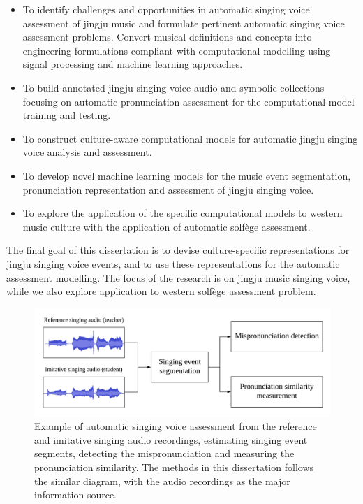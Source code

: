 \begin{itemize}[leftmargin=*]
\item To identify challenges and opportunities in automatic singing voice assessment of jingju music and formulate pertinent automatic singing voice assessment problems. Convert musical definitions and concepts into engineering formulations compliant with computational modelling using signal processing and machine learning approaches.
\item To build annotated jingju singing voice audio and symbolic collections focusing on automatic pronunciation assessment for the computational model training and testing.
\item To construct culture-aware computational models for automatic jingju singing voice analysis and assessment.
\item To develop novel machine learning models for the music event segmentation, pronunciation representation and assessment of jingju singing voice.
\item To explore the application of the specific computational models to western music culture with the application of automatic solfège assessment. 
\end{itemize}

The final goal of this dissertation is to devise culture-specific representations for jingju singing voice events, and to use these representations for the automatic assessment modelling. The focus of the research is on jingju music singing voice, while we also explore application to western solfège assessment problem.

\begin{figure}
\centering
\includegraphics[scale=0.2]{figs/blockDiags_rong/ch1_motivation_audio.png}
\caption[Example of automatic singing voice assessment from the reference and imitative singing audio recordings]{Example of automatic singing voice assessment from the reference and imitative singing audio recordings, estimating singing event segments, detecting the mispronunciation and measuring the pronunciation similarity. The methods in this dissertation follows the similar diagram, with the audio recordings as the major information source.}\label{fig:intro:chapread}
\end{figure}

